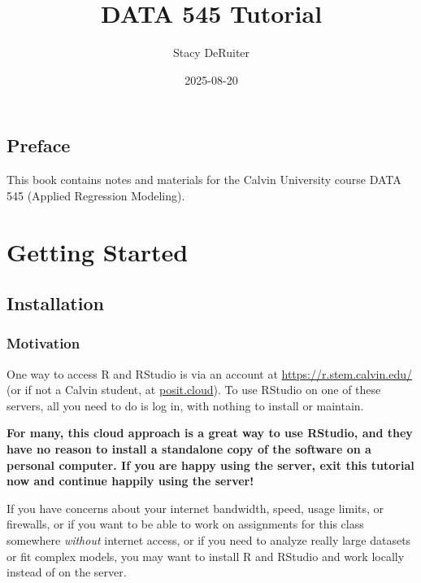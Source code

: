 \documentclass[
  letterpaper,
  DIV=11,
  numbers=noendperiod]{scrreprt}
\title{DATA 545 Tutorial}
\author{Stacy DeRuiter}
\date{2025-08-20}
\renewcommand*\contentsname{Table of contents}
\newcommand\contentsname{Table of contents}
\theoremstyle{remark}
\begin{document}
\maketitle

\renewcommand*\contentsname{Table of contents}
{
\hypersetup{linkcolor=}
\setcounter{tocdepth}{2}
\tableofcontents
}


\chapter*{Preface}\label{preface}


This book contains notes and materials for the Calvin University course
DATA 545 (Applied Regression Modeling).

\part{Getting Started}

\chapter{Installation}\label{installation}

\section{Motivation}\label{motivation}

One way to access R and RStudio is via an account at
\url{https://r.stem.calvin.edu/} (or if not a Calvin student, at
\href{https://posit.cloud}{posit.cloud}). To use RStudio on one of these
servers, all you need to do is log in, with nothing to install or
maintain.

\textbf{For many, this cloud approach is a great way to use RStudio, and
they have no reason to install a standalone copy of the software on a
personal computer. If you are happy using the server, exit this tutorial
now and continue happily using the server!}

If you have concerns about your internet bandwidth, speed, usage limits,
or firewalls, or if you want to be able to work on assignments for this
class somewhere \emph{without} internet access, or if you need to
analyze really large datasets or fit complex models, you may want to
install R and RStudio and work locally instead of on the server.
\end{document}
